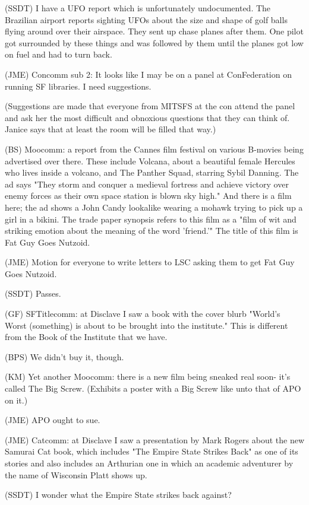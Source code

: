 \documentclass[12pt]{article}
\begin{document}
(SSDT) I have a UFO report which is unfortunately undocumented. The Brazilian airport reports sighting UFOs about the size and shape of golf balls flying around over their airspace. They sent up chase planes after them. One pilot got surrounded by these things and was followed by them until the planes got low on fuel and had to turn back.

(JME) Concomm sub 2: It looks like I may be on a panel at ConFederation on running SF libraries. I need suggestions.

(Suggestions are made that everyone from MITSFS at the con attend the panel and ask her the most difficult and obnoxious questions that they can think of. Janice says that at least the room will be filled that way.)

(BS) Moocomm: a report from the Cannes film festival on various B-movies being advertised over there. These include Volcana, about a beautiful female Hercules who lives inside a volcano, and The Panther Squad, starring Sybil Danning. The ad says "They storm and conquer a medieval fortress and achieve victory over enemy forces as their own space station is blown sky high." And there is a film here; the ad shows a John Candy lookalike wearing a mohawk trying to pick up a girl in a bikini. The trade paper synopsis refers to this film as a "film of wit and striking emotion about the meaning of the word 'friend.'" The title of this film is Fat Guy Goes Nutzoid.

(JME) Motion for everyone to write letters to LSC asking them to get Fat Guy Goes Nutzoid.

(SSDT) Passes.

(GF) SFTitlecomm: at Disclave I saw a book with the cover blurb "World's Worst (something) is about to be brought into the institute." This is different from the Book of the Institute that we have.

(BPS) We didn't buy it, though.

(KM) Yet another Moocomm: there is a new film being sneaked real soon- it's called The Big Screw. (Exhibits a poster with a Big Screw like unto that of APO on it.)

(JME) APO ought to sue.

(JME) Catcomm: at Disclave I saw a presentation by Mark Rogers about the new Samurai Cat book, which includes "The Empire State Strikes Back" as one of its stories and also includes an Arthurian one in which an academic adventurer by the name of Wisconsin Platt shows up.

(SSDT) I wonder what the Empire State strikes back against?
\end{document}
